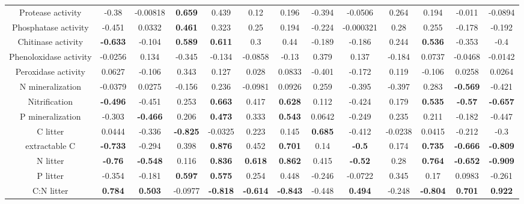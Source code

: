 \documentclass[10pt]{article}
\begin{document}
\begin{landscape}
\begin{table}[h!]
\begin{center}
{\begin{tabular}{ccccccccccccc}
  Protease activity & -0.38 & -0.00818 & \textbf{ 0.659 } & 0.439 & 0.12 & 0.196 & -0.394 & -0.0506 & 0.264 & 0.194 & -0.011 & -0.0894 \\ 
  Phosphatase activity & -0.451 & 0.0332 & \textbf{ 0.461 } & 0.323 & 0.25 & 0.194 & -0.224 & -0.000321 & 0.28 & 0.255 & -0.178 & -0.192 \\ 
  Chitinase activity & \textbf{ -0.633 } & -0.104 & \textbf{ 0.589 } & \textbf{ 0.611 } &  0.3 & 0.44 & -0.189 & -0.186 & 0.244 & \textbf{ 0.536 } & -0.353 & -0.4 \\ 
  Phenoloxidase activity & -0.0256 & 0.134 & -0.345 & -0.134 & -0.0858 & -0.13 & 0.379 & 0.137 & -0.184 & 0.0737 & -0.0468 & -0.0142 \\ 
  Peroxidase activity & 0.0627 & -0.106 & 0.343 & 0.127 & 0.028 & 0.0833 & -0.401 & -0.172 & 0.119 & -0.106 & 0.0258 & 0.0264 \\ 
  N mineralization & -0.0379 & 0.0275 & -0.156 & 0.236 & -0.0981 & 0.0926 & 0.259 & -0.395 & -0.397 & 0.283 & \textbf{ -0.569 } & -0.421 \\ 
  Nitrification & \textbf{ -0.496 } & -0.451 & 0.253 & \textbf{ 0.663 } & 0.417 & \textbf{ 0.628 } & 0.112 & -0.424 & 0.179 & \textbf{ 0.535 } & \textbf{ -0.57 } & \textbf{ -0.657 } \\ 
  P mineralization & -0.303 & \textbf{ -0.466 } & 0.206 & \textbf{ 0.473 } & 0.333 & \textbf{ 0.543 } & 0.0642 & -0.249 & 0.235 & 0.211 & -0.182 & -0.447 \\ 
  C litter & 0.0444 & -0.336 & \textbf{ -0.825 } & -0.0325 & 0.223 & 0.145 & \textbf{ 0.685 } & -0.412 & -0.0238 & 0.0415 & -0.212 & -0.3 \\ 
  extractable C & \textbf{ -0.733 } & -0.294 & 0.398 & \textbf{ 0.876 } & 0.452 & \textbf{ 0.701 } & 0.14 & \textbf{ -0.5 } & 0.174 & \textbf{ 0.735 } & \textbf{ -0.666 } & \textbf{ -0.809 } \\ 
  N litter & \textbf{ -0.76 } & \textbf{ -0.548 } & 0.116 & \textbf{ 0.836 } & \textbf{ 0.618 } & \textbf{ 0.862 } & 0.415 & \textbf{ -0.52 } & 0.28 & \textbf{ 0.764 } & \textbf{ -0.652 } & \textbf{ -0.909 } \\ 
  P litter & -0.354 & -0.181 & \textbf{ 0.597 } & \textbf{ 0.575 } & 0.254 & 0.448 & -0.246 & -0.0722 & 0.345 & 0.17 & 0.0983 & -0.261 \\ 
  C:N litter & \textbf{ 0.784 } & \textbf{ 0.503 } & -0.0977 & \textbf{ -0.818 } & \textbf{ -0.614 } & \textbf{ -0.843 } & -0.448 & \textbf{ 0.494 } & -0.248 & \textbf{ -0.804 } & \textbf{ 0.701 } & \textbf{ 0.922 } \\ 

\end{tabular}}
\end{center}
\end{table}
\end{landscape}
\end{document}
